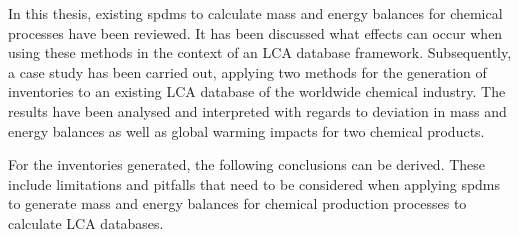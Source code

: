 In this thesis, existing \aclp{spdm} to calculate mass and energy balances for chemical processes have been reviewed. It has been discussed what effects can occur when using these methods in the context of an LCA database framework. Subsequently, a case study has been carried out, applying two methods for the generation of inventories to an existing LCA database of the worldwide chemical industry. The results have been analysed and interpreted with regards to deviation in mass and energy balances as well as global warming impacts for two chemical products.

For the inventories generated, the following conclusions can be derived. These include limitations and pitfalls that need to be considered when applying \aclp{spdm} to generate mass and energy balances for chemical production processes to calculate LCA databases.  
